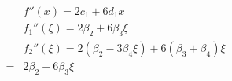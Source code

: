 \documentclass[10pt]{article}
\begin{document}
\begin{align*}&f''(x) = 2 c_1 + 6 d_1 x
\\
&f_1''(\xi) = 2 \beta_2 + 6 \beta_3 \xi
\\
&f_2''(\xi) = 2 (\beta_2 - 3 \beta_4 \xi) + 6 (\beta_3 + \beta_4) \xi
\\
= &2 \beta_2 + 6 \beta_3 \xi
\end{align*}
\end{document}
